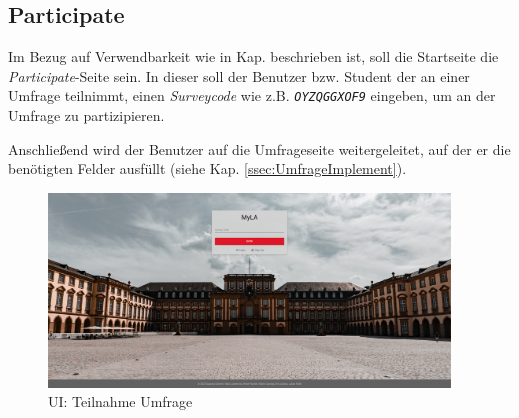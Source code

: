 
\subsection{Participate}
Im Bezug auf Verwendbarkeit wie in Kap.  beschrieben ist, soll die Startseite die \emph{Participate}-Seite sein. 
In dieser soll der Benutzer bzw. Student der an einer Umfrage teilnimmt, einen \emph{Surveycode} wie z.B. \emph{\texttt{OYZQGGXOF9}} eingeben, um an der Umfrage zu partizipieren. 

Anschließend wird der Benutzer auf die Umfrageseite weitergeleitet, auf der er die benötigten Felder ausfüllt (siehe Kap. \vref{ssec:UmfrageImplement}).

\begin{figure}[hp]
	\centering
	\includegraphics[width=0.95\textwidth, keepaspectratio]{img/client/Participate.png}
	\captionsetup{justification=centering, format=plain}
	\caption[\acf{UI}: Teilnahme Umfrage]{\acf{UI}: Teilnahme Umfrage \\ \quelleScreenshot}
	\label{fig:ParticipateImplement}
\end{figure}